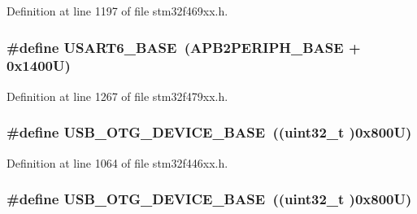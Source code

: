 Definition at line 1197 of file stm32f469xx.\+h.

\subsubsection[{\texorpdfstring{U\+S\+A\+R\+T6\+\_\+\+B\+A\+SE}{USART6_BASE}}]{\setlength{\rightskip}{0pt plus 5cm}\#define U\+S\+A\+R\+T6\+\_\+\+B\+A\+SE~({\bf A\+P\+B2\+P\+E\+R\+I\+P\+H\+\_\+\+B\+A\+SE} + 0x1400\+U)}\hypertarget{group___peripheral__memory__map_gade4d3907fd0387ee832f426f52d568bb}{}\label{group___peripheral__memory__map_gade4d3907fd0387ee832f426f52d568bb}


Definition at line 1267 of file stm32f479xx.\+h.

\subsubsection[{\texorpdfstring{U\+S\+B\+\_\+\+O\+T\+G\+\_\+\+D\+E\+V\+I\+C\+E\+\_\+\+B\+A\+SE}{USB_OTG_DEVICE_BASE}}]{\setlength{\rightskip}{0pt plus 5cm}\#define U\+S\+B\+\_\+\+O\+T\+G\+\_\+\+D\+E\+V\+I\+C\+E\+\_\+\+B\+A\+SE~((uint32\+\_\+t )0x800\+U)}\hypertarget{group___peripheral__memory__map_ga4d74a337597a77b1fca978202b519a18}{}\label{group___peripheral__memory__map_ga4d74a337597a77b1fca978202b519a18}


Definition at line 1064 of file stm32f446xx.\+h.

\subsubsection[{\texorpdfstring{U\+S\+B\+\_\+\+O\+T\+G\+\_\+\+D\+E\+V\+I\+C\+E\+\_\+\+B\+A\+SE}{USB_OTG_DEVICE_BASE}}]{\setlength{\rightskip}{0pt plus 5cm}\#define U\+S\+B\+\_\+\+O\+T\+G\+\_\+\+D\+E\+V\+I\+C\+E\+\_\+\+B\+A\+SE~((uint32\+\_\+t )0x800\+U)}\hypertarget{group___peripheral__memory__map_ga4d74a337597a77b1fca978202b519a18}{}\label{group___peripheral__memory__map_ga4d74a337597a77b1fca978202b519a18}


